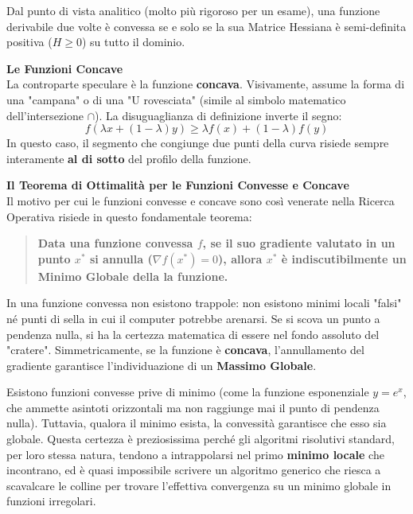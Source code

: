 \documentclass[12pt, a4paper]{article}
\newcommand{\separatore}{\noindent{\color{titlecolor!50}\rule{\textwidth}{0.6pt}}}
\begin{document}
	Dal punto di vista analitico (molto più rigoroso per un esame), una funzione derivabile due volte è convessa se e solo se la sua Matrice Hessiana è semi-definita positiva ($H \ge 0$) su tutto il dominio.
	
	\textbf{Le Funzioni Concave}\\
	La controparte speculare è la funzione \textbf{concava}. Visivamente, assume la forma di una "campana" o di una "U rovesciata" (simile al simbolo matematico dell'intersezione $\cap$). 
	La disuguaglianza di definizione inverte il segno:
	\[
	f(\lambda x + (1 - \lambda) y) \ge \lambda f(x) + (1 - \lambda) f(y)
	\]
	In questo caso, il segmento che congiunge due punti della curva risiede sempre interamente \textbf{al di sotto} del profilo della funzione.
	
	\vspace{0.4cm}
	\textbf{Il Teorema di Ottimalità per le Funzioni Convesse e Concave}\\
	Il motivo per cui le funzioni convesse e concave sono così venerate nella Ricerca Operativa risiede in questo fondamentale teorema:
	
	\begin{quote}
		\textbf{Data una funzione convessa $f$, se il suo gradiente valutato in un punto $x^*$ si annulla ($\nabla f(x^*) = 0$), allora $x^*$ è indiscutibilmente un Minimo Globale della la funzione.}
	\end{quote}
	In una funzione convessa non esistono trappole: non esistono minimi locali "falsi" né punti di sella in cui il computer potrebbe arenarsi. Se si scova un punto a pendenza nulla, si ha la certezza matematica di essere nel fondo assoluto del "cratere".
	Simmetricamente, se la funzione è \textbf{concava}, l'annullamento del gradiente garantisce l'individuazione di un \textbf{Massimo Globale}.
	
	Esistono funzioni convesse prive di minimo (come la funzione esponenziale $y = e^x$, che ammette asintoti orizzontali ma non raggiunge mai il punto di pendenza nulla). Tuttavia, qualora il minimo esista, la convessità garantisce che esso sia globale.
	Questa certezza è preziosissima perché gli algoritmi risolutivi standard, per loro stessa natura, tendono a intrappolarsi nel primo \textbf{minimo locale} che incontrano, ed è quasi impossibile scrivere un algoritmo generico che riesca a scavalcare le colline per trovare l'effettiva convergenza su un minimo globale in funzioni irregolari.
	
	\vspace{0.6cm}
	\separatore
	\vspace{0.4cm}
	
\end{document}
